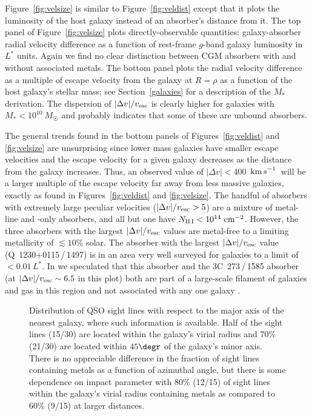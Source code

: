 \documentclass[twocolumn,twocolappendix,tighten,times]{aastex6}
\newcommand{\HI}{\ion{H}{1}}
\newcommand{\kms}{\ensuremath{{\rm km\,s}^{-1}}}
\begin{document}
Figure~\ref{fig:velsize} is similar to Figure~\ref{fig:veldist} except that 
it plots the luminosity of the host galaxy instead of an absorber's 
distance from it. The top panel of Figure~\ref{fig:velsize} plots 
directly-observable quantities: galaxy-absorber radial velocity difference 
as a function of rest-frame $g$-band galaxy luminosity in $L^*$ units. Again 
we find no clear distinction between CGM absorbers with and without associated 
metals. The bottom panel plots the radial velocity difference as a multiple of 
escape velocity from the galaxy at $R=\rho$ as a function of the host 
galaxy's stellar mass; see Section~\ref{galaxies} for a description of the $M_*$ 
derivation. The dispersion of $|\Delta v|/v_{\rm esc}$ is clearly higher for 
galaxies with $M_* < 10^{10}~M_{\Sun}$ and probably indicates that some of 
these are unbound absorbers.

The general trends found in the bottom panels of Figures~\ref{fig:veldist}
and \ref{fig:velsize} are unsurprising since lower mass galaxies have smaller 
escape velocities and the escape velocity for a given galaxy decreases as the 
distance from the galaxy increases. Thus, an observed value of 
$|\Delta v| < 400$~\kms\ will be a larger multiple of the escape velocity far 
away from less massive galaxies, exactly as found in Figures~\ref{fig:veldist} 
and \ref{fig:velsize}. The handful of absorbers with extremely large peculiar 
velocities ($|\Delta v|/v_{\rm esc} > 5$) are a mixture of metal-line and 
\HI-only absorbers, and all but one have $N_{\rm H\,I} < 10^{14}~{\rm cm}^{-2}$. 
However, the three absorbers with the largest $|\Delta v|/v_{\rm esc}$ values 
are metal-free to a limiting metallicity of $\lesssim10$\% solar. The absorber 
with the largest $|\Delta v|/v_{\rm esc}$ value (Q~1230+0115\,/\,1497) is in 
an area very well surveyed for galaxies to a limit of $<0.01\,L^*$. In 
\citet{rosenberg03} we speculated that this absorber and the 3C~273\,/\,1585 
absorber (at $|\Delta v|/v_{\rm esc}\sim6.5$ in this plot) both are part of a 
large-scale filament of galaxies and gas in this region and not associated with 
any one galaxy \citep[see also][]{keeney14}.


\begin{figure}[!t]
\caption{Distribution of QSO sight lines with respect to the major axis of the nearest galaxy, where such information is available. Half of the sight lines (15/30) are located within the galaxy's virial radius and 70\% (21/30) are located within $45\degr$ of the galaxy's minor axis. There is no appreciable difference in the fraction of sight lines containing metals as a function of azimuthal angle, but there is some dependence on impact parameter with 80\% (12/15) of sight lines within the galaxy's virial radius containing metals as compared to 60\% (9/15) at larger distances.
\label{fig:posang}}
\end{figure}
\end{document}
